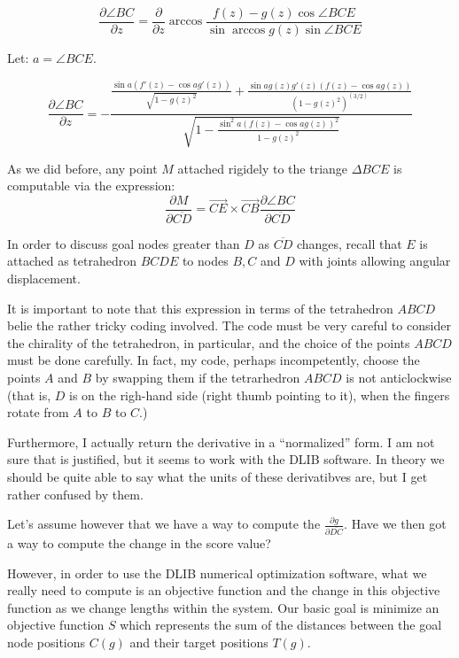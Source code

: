 \documentclass[11pt]{article}
\begin{document}
\begin{equation}
  \frac{\partial \angle BC}{\partial z} =
  \frac{\partial }{\partial z} \arccos{\frac{f(z) - g(z)\cos{\angle BCE}}{\sin{\arccos{g(z)}}\sin{\angle BCE}}}
\end{equation}

Let: $a = \angle BCE$.

\begin{equation}
  \frac{\partial \angle BC}{\partial z} =
  -\frac{\frac{\sin{a} (f'(z) - \cos{a} g'(z))}{\sqrt{1 - g(z)^2}} + \frac{\sin{a} g(z) g'(z) (f(z) - \cos{a} g(z))}{(1 - g(z)^2)^(3/2)}}
{\sqrt{1 - \frac{\sin^2{a} (f(z) - \cos{a} g(z))^2}{1 - g(z)^2}}}
\end{equation}


As we did before, any point $M$ attached rigidely to the triange $\Delta BCE$ is  computable via the expression:
\begin{equation}
  \frac{\partial M}{\partial \overline{CD}} = \overrightarrow{CE} \times \overrightarrow{CB}
  \frac{\partial \angle BC}{\partial \overline{CD}}
  \end{equation}

In order to discuss goal nodes greater than $D$ as $\overline{CD}$ changes, recall that $E$ is attached as tetrahedron $BCDE$ to nodes $B, C$ and $D$
with joints allowing angular displacement. 


 It is important to note that this expression in terms of the tetrahedron $ABCD$ belie the rather tricky coding
 involved. The code must be very careful to consider the chirality of the tetrahedron, in particular, and
 the choice of the points $ABCD$ must be done carefully. In fact, my code, perhaps incompetently, choose the points $A$ and $B$
 by swapping them if the tetrarhedron $ABCD$ is not anticlockwise (that is, $D$ is on the righ-hand side (right thumb pointing to it),
 when the fingers rotate from $A$ to $B$ to $C$.)

 Furthermore, I actually return the derivative in a ``normalized'' form. I am not sure that is justified, but it seems to work with the
 DLIB software. In theory we should be quite able to say what the units of these derivatibves are, but I get rather confused by them.
 
Let's assume however that we have a way to compute the $\frac{\partial g}{\partial \overline{DC}}$. Have we then got a way to compute
the change in the score value?

However, in order to use the DLIB numerical optimization software, what we really need to compute is
an objective function and the change in this objective function as we change lengths within the system.
Our basic goal is minimize an objective function $S$ which represents the sum of the distances between the
goal node positions $C(g)$  and their target positions $T(g)$.
\end{document}
